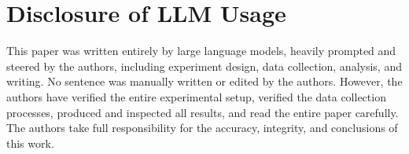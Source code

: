 \documentclass{article}
\begin{document}
\section*{Disclosure of LLM Usage}
This paper was written entirely by large language models, heavily
prompted and steered by the authors, including experiment design,
data collection, analysis, and writing. No sentence was manually written or edited by the authors.
However, the authors have verified the entire experimental setup,
verified the data collection processes, produced and inspected all
results, and read the entire paper carefully. The authors take
full responsibility for the accuracy, integrity, and conclusions
of this work.



\end{document}
